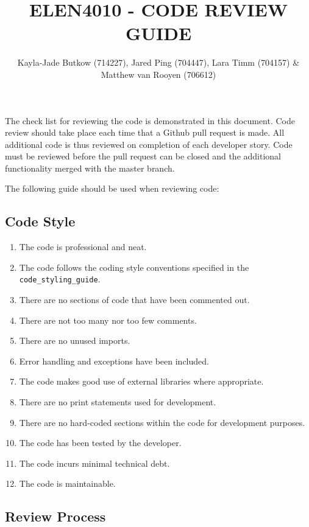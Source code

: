 \documentclass[10pt,onecolumn]{witseiepaper}
\title{ELEN4010 - CODE REVIEW GUIDE}
\author{Kayla-Jade Butkow (714227), Jared Ping (704447), Lara Timm (704157) \& Matthew van Rooyen (706612)}
\begin{document}
\maketitle
\pagestyle{plain}
\setcounter{page}{1}

The check list for reviewing the code is demonstrated in this document. Code review should take place each time that a Github pull request is made. All additional code is thus reviewed on completion of each developer story. Code must be reviewed before the pull request can be closed and the additional functionality merged with the master branch.


The following guide should be used when reviewing code:

\vspace{3mm}
\subsection*{\textbf{Code Style}}

\begin{enumerate}
	\item The code is professional and neat.
	\item The code follows the coding style conventions specified in the \texttt{code\_styling\_guide}.
	\item There are no sections of code that have been commented out.
	\item There are not too many nor too few comments.
	\item There are no unused imports.
	\item Error handling and exceptions have been included.
	\item The code makes good use of external libraries where appropriate.
	\item There are no print statements used for development.
	\item There are no hard-coded sections within the code for development purposes.
	\item The code has been tested by the developer.
	\item The code incurs minimal technical debt.
	\item The code is maintainable.
	
\end{enumerate}

\vspace{3mm}
\subsection*{\textbf{Review Process}}
\end{document}
